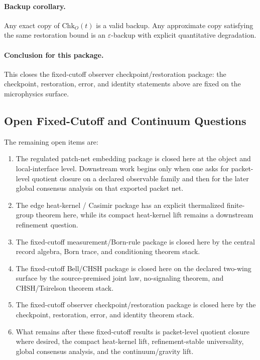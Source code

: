 \documentclass[11pt]{article}
\begin{document}
\paragraph{Backup corollary.}
Any exact copy of $\mathrm{Chk}_O(t)$ is a valid backup. Any approximate copy satisfying the
same restoration bound is an $\varepsilon$-backup with explicit quantitative degradation.

\paragraph{Conclusion for this package.}
This closes the fixed-cutoff observer checkpoint/restoration package: the checkpoint, restoration, error, and identity statements above are fixed on the microphysics surface.

\subsection{Open Fixed-Cutoff and Continuum Questions}

The remaining open items are:
\begin{enumerate}[leftmargin=2em]
\item The regulated patch-net embedding package is closed here at the object and local-interface
level. Downstream work begins only when one asks for packet-level quotient closure on a declared
observable family and then for the later global consensus analysis on that exported packet net.
\item The edge heat-kernel / Casimir package has an explicit thermalized finite-group theorem
here, while its compact heat-kernel lift remains a downstream refinement question.
\item The fixed-cutoff measurement/Born-rule package is closed here by the central record
algebra, Born trace, and conditioning theorem stack.
\item The fixed-cutoff Bell/CHSH package is closed here on the declared two-wing surface by the
source-premised joint law, no-signaling theorem, and CHSH/Tsirelson theorem stack.
\item The fixed-cutoff observer checkpoint/restoration package is closed here by the
checkpoint, restoration, error, and identity theorem stack.
\item What remains after these fixed-cutoff results is packet-level quotient closure where
desired, the compact heat-kernel lift, refinement-stable universality, global consensus analysis,
and the continuum/gravity lift.
\end{enumerate}
\end{document}
